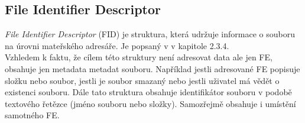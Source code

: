 \subsection{File Identifier Descriptor}
\label{sec:fid}
\textit{File Identifier Descriptor} (FID) je struktura, která udržuje informace o souboru na úrovni mateřského adresáře. Je popsaný v \cite{osta-udf-0201} v kapitole 2.3.4.\\
Vzhledem k faktu, že cílem této struktury není adresovat data ale jen FE, obsahuje jen metadata metadat souboru. Například jestli adresované FE popisuje složku nebo soubor, jestli je soubor smazaný nebo jestli uživatel má vědět o existenci souboru. Dále tato struktura obsahuje identifikátor souboru v podobě textového řetězce (jméno souboru nebo složky). Samozřejmě obsahuje i umístění samotného FE.


